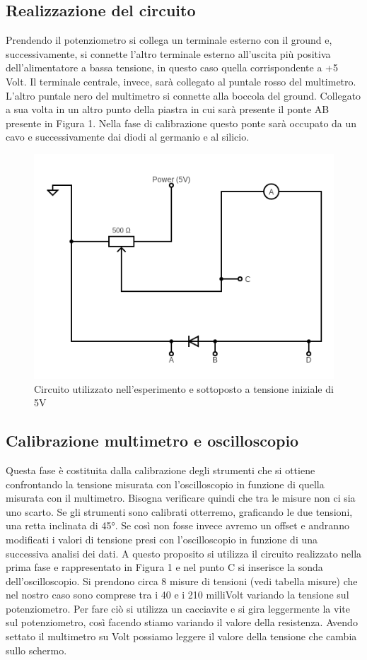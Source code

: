 \documentclass{article}
\begin{document}
\subsection{Realizzazione del circuito}
Prendendo il potenziometro si collega un terminale esterno con il ground e,  successivamente, si connette l’altro terminale esterno all’uscita più positiva dell’alimentatore a bassa tensione, in questo caso quella corrispondente a +5 Volt.
Il terminale centrale, invece, sarà collegato al puntale rosso del multimetro. L’altro puntale nero del multimetro si connette alla boccola del ground. Collegato a sua volta in un altro punto della piastra in cui sarà presente il ponte AB presente in Figura 1. Nella fase di calibrazione questo ponte sarà occupato da un cavo e successivamente dai diodi al germanio e al silicio.

\begin{figure}
\centering
\includegraphics[scale=0.50]{Circuit}
\caption{Circuito utilizzato nell'esperimento e sottoposto a tensione iniziale di 5V} 
\end{figure}
\subsection{Calibrazione multimetro e oscilloscopio}
Questa fase è costituita dalla calibrazione degli strumenti che si ottiene confrontando la tensione misurata con l’oscilloscopio in funzione di quella misurata con il multimetro. Bisogna verificare quindi che tra le misure non ci sia uno scarto. Se gli strumenti sono calibrati otterremo, graficando le due tensioni, una retta inclinata di 45°. Se così non fosse invece avremo un offset e andranno modificati i valori di tensione presi con l’oscilloscopio in funzione di una successiva analisi dei dati.
A questo proposito si utilizza il circuito realizzato nella prima fase e rappresentato in Figura 1 e nel punto C si inserisce la sonda dell’oscilloscopio.
Si prendono circa 8 misure di tensioni (vedi tabella misure) che nel nostro caso sono comprese tra i 40 e i 210 milliVolt variando la tensione sul potenziometro. Per fare ciò si utilizza un cacciavite e si gira leggermente la vite sul potenziometro, così facendo stiamo variando il valore della resistenza. Avendo settato il multimetro su Volt possiamo leggere il valore della tensione che cambia sullo schermo.
\end{document}
